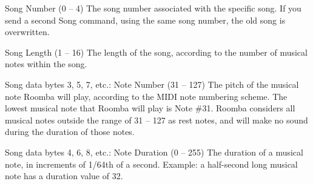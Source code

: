 \begin{Desc}
\begin{description}
\begin{DoxyItemize}
\item Song Number (0 – 4) The song number associated with the specific song. If you send a second Song command, using the same song number, the old song is overwritten.
\item Song Length (1 – 16) The length of the song, according to the number of musical notes within the song.
\item Song data bytes 3, 5, 7, etc.\+: Note Number (31 – 127) The pitch of the musical note Roomba will play, according to the M\+I\+D\+I note numbering scheme. The lowest musical note that Roomba will play is Note \#31. Roomba considers all musical notes outside the range of 31 – 127 as rest notes, and will make no sound during the duration of those notes.
\item Song data bytes 4, 6, 8, etc.\+: Note Duration (0 – 255) The duration of a musical note, in increments of 1/64th of a second. Example\+: a half-\/second long musical note has a duration value of 32.
\end{DoxyItemize}


\end{description}
\end{Desc}
